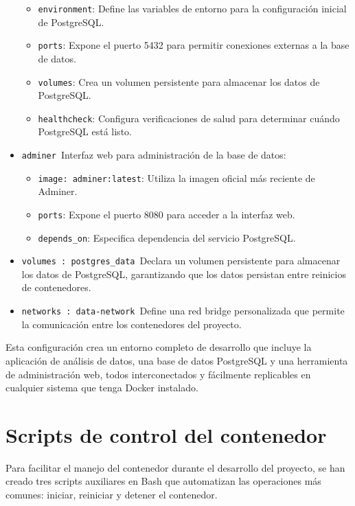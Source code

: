 \begin{itemize}
\begin{itemize}
  \item \texttt{environment}: Define las variables de entorno para la configuración inicial de PostgreSQL.
  \item \texttt{ports}: Expone el puerto 5432 para permitir conexiones externas a la base de datos.
  \item \texttt{volumes}: Crea un volumen persistente para almacenar los datos de PostgreSQL.
  \item \texttt{healthcheck}: Configura verificaciones de salud para determinar cuándo PostgreSQL está listo.
  \end{itemize}
  \item \texttt{adminer}\
  Interfaz web para administración de la base de datos:
  \begin{itemize}
  \item \texttt{image: adminer:latest}: Utiliza la imagen oficial más reciente de Adminer.
  \item \texttt{ports}: Expone el puerto 8080 para acceder a la interfaz web.
  \item \texttt{depends\_on}: Especifica dependencia del servicio PostgreSQL.
  \end{itemize}
  \item \texttt{volumes : postgres\_data}\
  Declara un volumen persistente para almacenar los datos de PostgreSQL, garantizando que los datos persistan entre reinicios de contenedores.
  \item \texttt{networks : data-network}\
  Define una red bridge personalizada que permite la comunicación entre los contenedores del proyecto.
\end{itemize}
Esta configuración crea un entorno completo de desarrollo que incluye la aplicación de análisis de datos, una base de datos PostgreSQL y una herramienta de administración web, todos interconectados y fácilmente replicables en cualquier sistema que tenga Docker instalado.
\newpage

\section{Scripts de control del contenedor}

Para facilitar el manejo del contenedor durante el desarrollo del proyecto, se han creado tres scripts auxiliares en Bash que automatizan las operaciones más comunes: iniciar, reiniciar y detener el contenedor.

